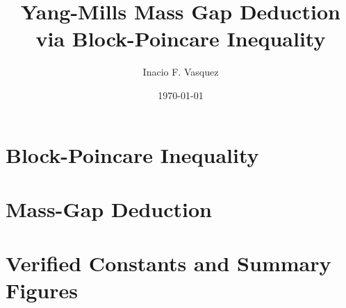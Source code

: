 \documentclass[11pt]{article}
\title{Yang-Mills Mass Gap Deduction via Block-Poincare Inequality}
\author{Inacio F. Vasquez}
\date{\today}
\begin{document}
\maketitle

\section{Block-Poincare Inequality}


\section{Mass-Gap Deduction}


\section{Verified Constants and Summary Figures}
\end{document}
